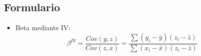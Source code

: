 \documentclass[10pt,a4paper]{article}
\begin{document}
\begin{enumerate}











\newpage
\section*{Formulario}
\begin{itemize}

\item Beta mediante IV:
$$\beta^{IV}=\frac{Cov(y,z)}{Cov(z,x)}=\frac{\sum (y_i - \bar{y})(z_i - \bar{z})}{\sum (x_i - \bar{x})(z_i - \bar{z})}$$


\end{itemize}
\end{enumerate}
\end{document}
